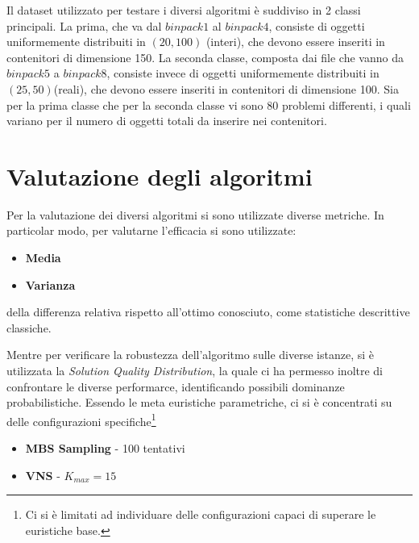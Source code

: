 \documentclass{article}
\begin{document}
Il dataset utilizzato\cite{Falkenauer} per testare i diversi algoritmi è suddiviso in 2 classi principali. La prima, che va dal $binpack1$ al $binpack4$, consiste di oggetti uniformemente distribuiti in $(20, 100)$ (interi), che devono essere inseriti in contenitori di dimensione 150. La seconda classe, composta dai file che vanno da $binpack5$ a $binpack8$, consiste invece di oggetti uniformemente distribuiti in $(25, 50)$(reali), che devono essere inseriti in contenitori di dimensione 100.
\newline
\newline
Sia per la prima classe che per la seconda classe vi sono 80 problemi differenti, i quali variano per il numero di oggetti totali da inserire nei contenitori.

\section{Valutazione degli algoritmi}

Per la valutazione dei diversi algoritmi si sono utilizzate diverse metriche. In particolar modo, per valutarne l'efficacia si sono utilizzate:

\begin{itemize}
\item \textbf{Media}
\item \textbf{Varianza}
\end{itemize}
della differenza relativa rispetto all'ottimo conosciuto, come statistiche descrittive classiche.

Mentre per verificare la robustezza dell'algoritmo sulle diverse istanze, si è utilizzata la \textit{Solution Quality Distribution}, la quale ci ha permesso inoltre di confrontare le diverse performarce, identificando possibili dominanze probabilistiche.
\newline
\newline
Essendo le meta euristiche parametriche, ci si è concentrati su delle configurazioni specifiche\footnote{Ci si è limitati ad individuare delle configurazioni capaci di superare le euristiche base.}

\begin{itemize}
\item \textbf{MBS Sampling} - 100 tentativi
\item \textbf{VNS} - $K_{max} = 15$ 
\end{itemize}
\end{document}
